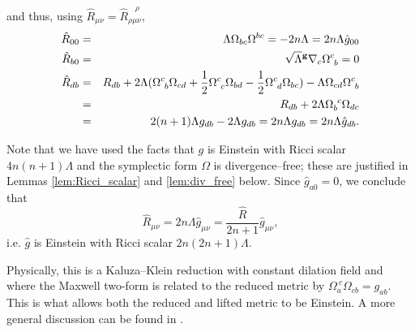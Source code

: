 and thus, using $\hat{R}_{\mu\nu}=\hat{R}_{\rho\mu\nu}^{\ \ \ \ \rho}$,
\begin{eqnarray*}
\hat{R}_{00} & = & \Lambda\Omega_{bc}\Omega^{bc}=-2n\Lambda=2n\Lambda\hat{g}_{00}\\
\hat{R}_{b0} & = & \sqrt{\Lambda}{^{\bf g}\nabla}_{c}\Omega_{\ b}^{c}=0\\
\hat{R}_{db} & = & R_{db}+2\Lambda(\Omega_{\ b}^{c}\Omega_{cd}+\frac{1}{2}\Omega_{\ c}^{c}\Omega_{bd}-\frac{1}{2}\Omega_{\ d}^{c}\Omega_{bc})-\Lambda\Omega_{cd}\Omega_{\ b}^{c}\\
 & = & R_{db}+2\Lambda\Omega_{b}^{\ c}\Omega_{dc}\\
 & = & 2(n+1)\Lambda g_{db}-2\Lambda g_{db}=2n\Lambda g_{db}=2n\Lambda\hat{g}_{db}.
\end{eqnarray*}


Note that we have used the facts that $g$ is Einstein with Ricci
scalar $4n(n+1)\Lambda$ and the symplectic form $\Omega$ is divergence--free;
these are justified in Lemmas \ref{lem:Ricci_scalar} and \ref{lem:div_free} below. Since $\hat{g}_{a0}=0$,
we conclude that
\[
\hat{R}_{\mu\nu}=2n\Lambda\hat{g}_{\mu\nu}=\frac{\hat{R}}{2n+1}\hat{g}_{\mu\nu},
\]
i.e. $\hat{g}$ is Einstein with Ricci scalar $2n(2n+1)\Lambda$.
\koniec

Physically, this is a Kaluza--Klein reduction with constant dilation
field and where the Maxwell two-form is related to the reduced metric
by $\Omega_{a}^{\ c}\Omega_{cb}=g_{ab}$. This is what allows both
the reduced and lifted metric to be Einstein. A more general discussion
can be found in \cite{Pope}.

